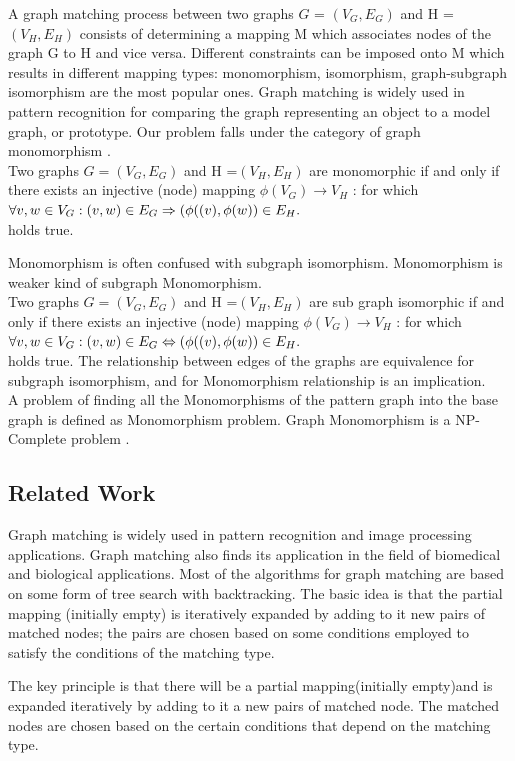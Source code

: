A graph matching process between two graphs $G$ = $(V_G,E_G)$ and H = $(V_H,E_H)$ consists of determining a mapping M which associates nodes of the graph G to H and vice versa. Different constraints can be imposed onto M which results in different mapping types: monomorphism, isomorphism, graph-subgraph isomorphism are the most popular ones. Graph matching is widely used in pattern recognition for comparing the graph representing an object to a model  graph, or prototype. Our problem falls under the category of graph monomorphism . \\
Two graphs 
 $G =( V_G, E_G)$ and
 H =$( V_H, E_H)$  are monomorphic  if and only if there exists an injective (node)
mapping $\phi (V_G) \rightarrow  V_H$ : for which $\forall v,w \in V_G:(v,w) \in E_G \Rightarrow (\phi((v),\space \phi(w)) \in E_H.$\\  holds
true. 

Monomorphism is often confused with subgraph isomorphism. Monomorphism is weaker kind of subgraph Monomorphism. \\
Two graphs  $G =( V_G, E_G)$ and
 H =$( V_H, E_H)$  are sub graph isomorphic  if and only if there exists an injective (node)
mapping $\phi( V_G) \rightarrow  V_H$ : for which $\forall v,w \in V_G:(v,w) \in E_G \Leftrightarrow (\phi((v),\space \phi(w)) \in E_H.$\\  holds
true. 
The relationship between edges of the graphs are equivalence for subgraph isomorphism, and for Monomorphism  relationship  is an implication.\\
A problem of finding all the Monomorphisms of the pattern graph into the base graph is defined as Monomorphism problem. Graph Monomorphism is a NP-Complete problem \cite{Garey:1979:CIG:578533}. 
\subsection{Related Work}

Graph matching is widely used in pattern recognition and image processing applications. Graph matching also finds its application in the field of biomedical and biological applications. 
Most of the algorithms for graph matching are based on some form of tree search with backtracking.
 The basic idea is that the partial mapping (initially empty) is iteratively expanded by adding to it new pairs of matched nodes; the pairs are chosen based on some conditions employed to satisfy the conditions of the matching type.

The key principle is that there will be a partial mapping(initially empty)and is expanded iteratively by adding to it a new pairs of matched node. The matched nodes are chosen based on the certain conditions that depend on the matching type.

